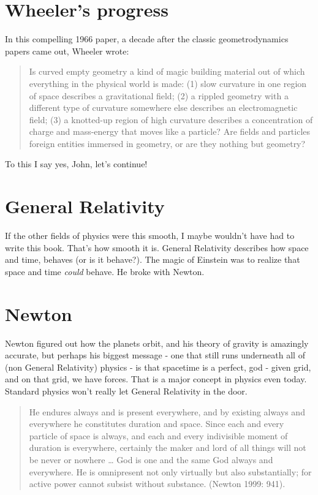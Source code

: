 \documentclass[../rzero]{subfiles}
\begin{document}
\section{Wheeler's progress}
In this compelling 1966 paper\cite{wheelerCurvedEmptySpaceTime1966}, a decade after the classic geometrodynamics\cite{Misner:1957mt}\cite{Wheeler1957quantumGeo} papers came out, Wheeler wrote:
\begin{quotation}
	Is curved empty geometry a kind of magic building material out of which everything in the physical world is made: (1) slow curvature in one region of space describes a gravitational field; (2) a rippled geometry with a different type of curvature somewhere else describes an electromagnetic field; (3) a knotted-up region of high curvature describes a concentration of charge and mass-energy that moves like a particle? Are fields and particles foreign entities immersed in geometry, or are they nothing but geometry?
\end{quotation}

To this I say yes, John, let's continue!

\section{General Relativity}
If the other fields of physics were this smooth, I maybe wouldn't have had to write this book. That's how smooth it is. General Relativity describes how space and time, behaves (or is it behave?). The magic of Einstein was to realize that space and time \textit{could} behave. He broke with Newton.


\section{Newton}
Newton figured out how the planets orbit, and his theory of gravity is amazingly accurate, but perhaps his biggest message - one that still runs underneath all of (non General Relativity) physics - is that spacetime is a perfect, god - given grid, and on that grid, we have forces. That is a major concept in physics even today. Standard physics won't really let General Relativity in the door.  

\begin{quotation}
	He endures always and is present everywhere, and by existing always and everywhere he constitutes duration and space. Since each and every particle of space is always, and each and every indivisible moment of duration is everywhere, certainly the maker and lord of all things will not be never or nowhere … God is one and the same God always and everywhere. He is omnipresent not only virtually but also substantially; for active power cannot subsist without substance. (Newton 1999: 941).
\end{quotation} 
\end{document}
